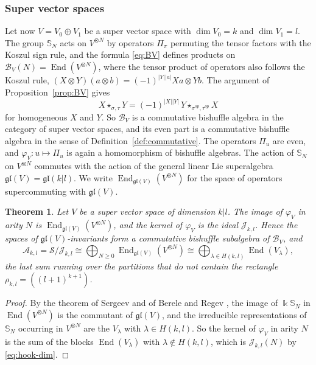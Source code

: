 \documentclass[11pt]{amsart}
\newtheorem{theorem}{Theorem}[section]
\theoremstyle{definition}
\theoremstyle{remark}
\newcommand{\bS}{\mathbb{S}}
\newcommand{\kk}{\Bbbk}
\newcommand{\cA}{\mathscr{A}}
\newcommand{\cB}{\mathcal{B}}
\newcommand{\cJ}{\mathscr{J}}
\newcommand{\cS}{\mathscr{S}}
\newcommand{\End}{\operatorname{End}}
\begin{document}
\subsubsection{Super vector spaces}
Let now $V=V_0\oplus V_1$ be a super vector space with $\dim V_0=k$ and $\dim V_1=l$. The group $\bS_N$ acts on $V^{\otimes N}$ by operators $\Pi_\pi$ permuting the tensor factors with the Koszul sign rule, and the formula \eqref{eq:BV} defines products on $\cB_V(N)=\End(V^{\otimes N})$, where the tensor product of operators also follows the Koszul rule, $(X\otimes Y)(a\otimes b)=(-1)^{|Y||a|}Xa\otimes Yb$. The argument of Proposition~\ref{prop:BV} gives
\[
X\star_{\sigma,\tau}Y=(-1)^{|X||Y|}\,Y\star_{\sigma^{op},\tau^{op}}X
\]
for homogeneous $X$ and $Y$. So $\cB_V$ is a commutative bishuffle algebra in the category of super vector spaces, and its even part is a commutative bishuffle algebra in the sense of Definition~\ref{def:commutative}. The operators $\Pi_u$ are even, and $\varphi_V\colon u\mapsto\Pi_u$ is again a homomorphism of bishuffle algebras. The action of $\bS_N$ on $V^{\otimes N}$ commutes with the action of the general linear Lie superalgebra $\mathfrak{gl}(V)=\mathfrak{gl}(k|l)$. We write $\End_{\mathfrak{gl}(V)}(V^{\otimes N})$ for the space of operators supercommuting with $\mathfrak{gl}(V)$.

\begin{theorem}\label{thm:super-SW}
Let $V$ be a super vector space of dimension $k|l$. The image of $\varphi_V$ in arity $N$ is $\End_{\mathfrak{gl}(V)}(V^{\otimes N})$, and the kernel of $\varphi_V$ is the ideal $\cJ_{k,l}$. Hence the spaces of $\mathfrak{gl}(V)$-invariants form a commutative bishuffle subalgebra of $\cB_V$, and
\[
\cA_{k,l}=\cS/\cJ_{k,l}\cong\bigoplus_{N\ge0}\End_{\mathfrak{gl}(V)}(V^{\otimes N})\cong\bigoplus_{\lambda\in H(k,l)}\End(V_\lambda),
\]
the last sum running over the partitions that do not contain the rectangle $\rho_{k,l}=((l+1)^{k+1})$.
\end{theorem}

\begin{proof}
By the theorem of Sergeev and of Berele and Regev \cite{Sergeev,BR}, the image of $\kk\bS_N$ in $\End(V^{\otimes N})$ is the commutant of $\mathfrak{gl}(V)$, and the irreducible representations of $\bS_N$ occurring in $V^{\otimes N}$ are the $V_\lambda$ with $\lambda\in H(k,l)$. So the kernel of $\varphi_V$ in arity $N$ is the sum of the blocks $\End(V_\lambda)$ with $\lambda\notin H(k,l)$, which is $\cJ_{k,l}(N)$ by \eqref{eq:hook-dim}.
\end{proof}
\end{document}
